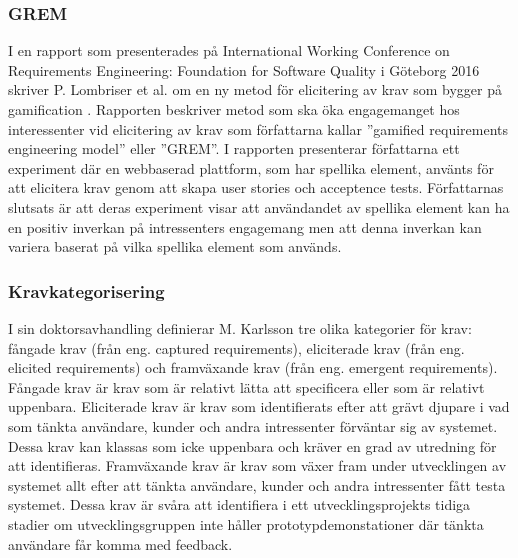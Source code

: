 \subsubsection{GREM}
I en rapport som presenterades på International Working Conference on Requirements Engineering: Foundation for Software Quality i Göteborg 2016 skriver P. Lombriser et al. om en ny metod för elicitering av krav som bygger på gamification \cite{lombriser2016gamified}. Rapporten beskriver metod som ska öka engagemanget hos interessenter vid elicitering av krav som författarna kallar ”gamified requirements engineering model” eller ”GREM”. I rapporten presenterar författarna ett experiment där en webbaserad plattform, som har spellika element, använts för att elicitera krav genom att skapa user stories och acceptence tests. Författarnas slutsats är att deras experiment visar att användandet av spellika element kan ha en positiv inverkan på intressenters engagemang men att denna inverkan kan variera baserat på vilka spellika element som används.

\subsubsection{Kravkategorisering}
I sin doktorsavhandling definierar M. Karlsson tre olika kategorier för krav: fångade krav (från eng. captured requirements), eliciterade krav (från eng. elicited requirements) och framväxande krav (från eng. emergent requirements)\cite{lkp.26083619960101}. Fångade krav är krav som är relativt lätta att specificera eller som är relativt uppenbara. Eliciterade krav är krav som identifierats efter att grävt djupare i vad som tänkta användare, kunder och andra intressenter förväntar sig av systemet. Dessa krav kan klassas som icke uppenbara och kräver en grad av utredning för att identifieras. Framväxande krav är krav som växer fram under utvecklingen av systemet allt efter att tänkta användare, kunder och andra intressenter fått testa systemet. Dessa krav är svåra att identifiera i ett utvecklingsprojekts tidiga stadier om utvecklingsgruppen inte håller prototypdemonstationer där tänkta användare får komma med feedback. 
 
